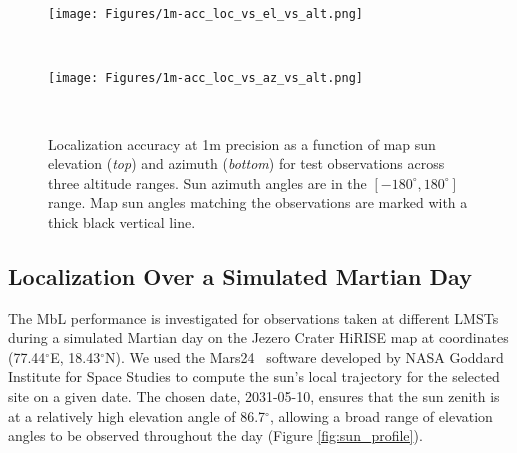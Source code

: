 
\begin{figure}
\centering
\begin{minipage}[b]{1.0\linewidth}
    \centering
    \texttt{[image: Figures/1m-acc\_loc\_vs\_el\_vs\_alt.png]}    
\end{minipage}
\vspace{5pt} \\
\begin{minipage}[b]{1.0\linewidth}
    \centering
    \texttt{[image: Figures/1m-acc\_loc\_vs\_az\_vs\_alt.png]}    
\end{minipage}
\vspace{-5pt} \\
\caption{Localization accuracy at 1m precision as a function of map sun elevation (\textit{top}) and azimuth (\textit{bottom}) for test observations across three altitude ranges. Sun azimuth angles are in the $[-180^{\circ}, 180^{\circ}]$ range. Map sun angles matching the observations are marked with a thick black vertical line.}
\label{fig:mbl_loc_acc_vs_el_and_az_vs_alt}
\end{figure}

\subsection{Localization Over a Simulated Martian Day}
\label{subsec:mbl_martian_day}
The MbL performance is investigated for observations taken at different LMSTs during a simulated Martian day on the Jezero Crater HiRISE map at coordinates (77.44$^{\circ}$E, 18.43$^{\circ}$N). We used the Mars24~\cite{mars24} software developed by NASA Goddard Institute for Space Studies to compute the sun's local trajectory for the selected site on a given date. The chosen date, 2031-05-10, ensures that the sun zenith is at a relatively high elevation angle of 86.7$^{\circ}$, allowing a broad range of elevation angles to be observed throughout the day (Figure \ref{fig:sun_profile}). 

